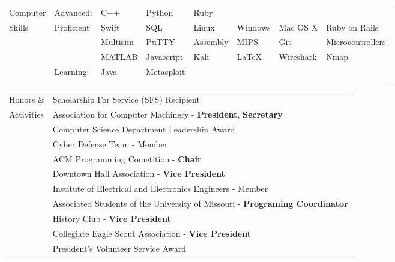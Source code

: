 \documentclass[10.5pt, arial]{article}
\begin{document}
\begin{tabular}{p{1.5cm} l l l l l l l}
Computer	& Advanced: 	& C++ 		& Python 	& Ruby		& 			& 			& 					\\
Skills		& Proficient:	& Swift 	& SQL 		& Linux 	& Windows 	& Mac OS X 	& Ruby on Rails  	\\
			&				& Multisim 	& PuTTY 	& Assembly 	& MIPS 		& Git 		& Microcontrollers  \\
			& 				& MATLAB	& Javascript& Kali		& LaTeX		& Wireshark	& Nmap				\\
			& Learning:		& Java 		& Metasploit& 			& 			& 			& 					\\ \\
\end{tabular}

\begin{tabular}{p{1.5cm} l}
Honors \&	& Scholarship For Service (SFS) Recipient 																	\\
Activities	& Association for Computer Machinery - \textbf{President}, \textbf{Secretary}								\\
			& Computer Science Department Leadership Award 																\\
			& Cyber Defense Team - Member																				\\
			& ACM Programming Cometition - \textbf{Chair}																\\
			& Downtown Hall Association - \textbf{Vice President}														\\
			& Institute of Electrical and Electronics Engineers - Member												\\
			& Associated Students of the University of Missouri - \textbf{Programing Coordinator} 						\\
			& History Club - \textbf{Vice President} 																	\\
			& Collegiate Eagle Scout Association - \textbf{Vice President} 		 										\\
			& President's Volunteer Service Award																		\\
\end{tabular}
\end{document}
